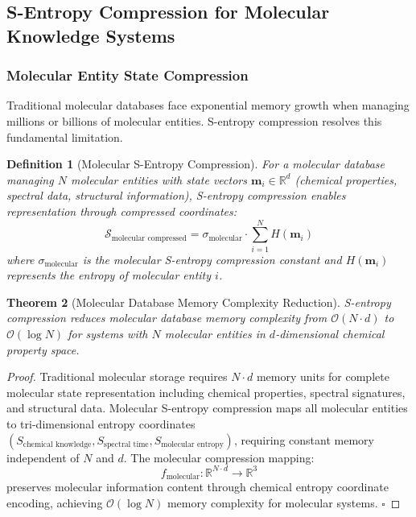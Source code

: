 \documentclass[11pt,a4paper]{article}
\newtheorem{theorem}{Theorem}[section]
\newtheorem{definition}[theorem]{Definition}
\theoremstyle{remark}
\begin{document}
{{{{{{{{{{\subsection{S-Entropy Compression for Molecular Knowledge Systems}

\subsubsection{Molecular Entity State Compression}

Traditional molecular databases face exponential memory growth when managing millions or billions of molecular entities. S-entropy compression resolves this fundamental limitation.

\begin{definition}[Molecular S-Entropy Compression]
For a molecular database managing $N$ molecular entities with state vectors $\mathbf{m}_i \in \mathbb{R}^d$ (chemical properties, spectral data, structural information), S-entropy compression enables representation through compressed coordinates:
\begin{equation}
\mathcal{S}_{\text{molecular compressed}} = \sigma_{\text{molecular}} \cdot \sum_{i=1}^{N} H(\mathbf{m}_i)
\end{equation}
where $\sigma_{\text{molecular}}$ is the molecular S-entropy compression constant and $H(\mathbf{m}_i)$ represents the entropy of molecular entity $i$.
\end{definition}

\begin{theorem}[Molecular Database Memory Complexity Reduction]
S-entropy compression reduces molecular database memory complexity from $\mathcal{O}(N \cdot d)$ to $\mathcal{O}(\log N)$ for systems with $N$ molecular entities in $d$-dimensional chemical property space.
\end{theorem}

\begin{proof}
Traditional molecular storage requires $N \cdot d$ memory units for complete molecular state representation including chemical properties, spectral signatures, and structural data. Molecular S-entropy compression maps all molecular entities to tri-dimensional entropy coordinates $(S_{\text{chemical knowledge}}, S_{\text{spectral time}}, S_{\text{molecular entropy}})$, requiring constant memory independent of $N$ and $d$. The molecular compression mapping:
\begin{equation}
f_{\text{molecular}}: \mathbb{R}^{N \cdot d} \rightarrow \mathbb{R}^3
\end{equation}
preserves molecular information content through chemical entropy coordinate encoding, achieving $\mathcal{O}(\log N)$ memory complexity for molecular systems. $\square$
\end{proof}

}}}}}}}}}}
\end{document}
